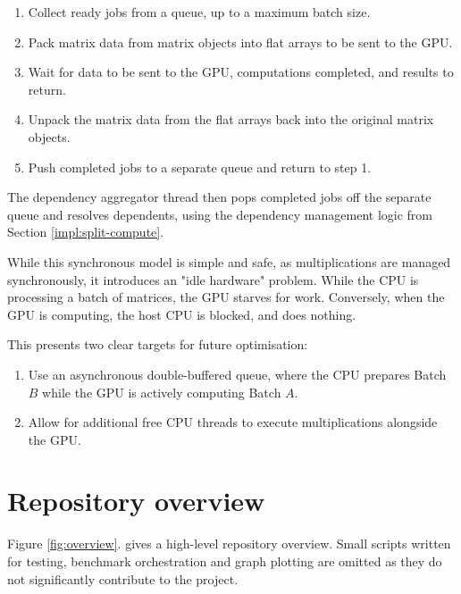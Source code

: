 \begin{enumerate}
  \item Collect ready jobs from a queue, up to a maximum batch size.
  \item Pack matrix data from matrix objects into flat arrays to be sent to the GPU.
  \item Wait for data to be sent to the GPU, computations completed, and results to return.
  \item Unpack the matrix data from the flat arrays back into the original matrix objects.
  \item Push completed jobs to a separate queue and return to step 1.
\end{enumerate}

The dependency aggregator thread then pops completed jobs off the separate queue and resolves dependents, using the dependency 
management logic from Section \ref{impl:split-compute}.

While this synchronous model is simple and safe, as multiplications are managed synchronously, it introduces an "idle hardware" 
problem. While the CPU is processing a batch of matrices, the GPU starves for work. Conversely, when the GPU is computing, 
the host CPU is blocked, and does nothing.

This presents two clear targets for future optimisation:

\begin{enumerate}
  \item Use an asynchronous double-buffered queue, where the CPU prepares Batch $B$ while the GPU is actively computing 
    Batch $A$.
  \item Allow for additional free CPU threads to execute multiplications alongside the GPU.
\end{enumerate}

\section{Repository overview}

Figure \ref{fig:overview}.
gives a high-level repository overview.
Small scripts written for testing, benchmark orchestration and graph plotting are omitted as they do not significantly 
contribute to the project.

